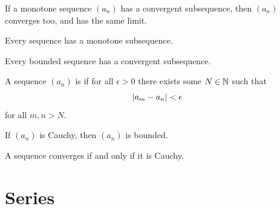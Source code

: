 \documentclass[11pt,twoside=off,numbers=noenddot]{scrbook}
\begin{document}
\begin{proposition}
  If a monotone sequence $(a_n)$ has a convergent subsequence, then
  $(a_n)$ converges too, and has the same limit.
\end{proposition}

\begin{lemma}
  Every sequence has a monotone subsequence.
\end{lemma}

\begin{theorem}
  Every bounded sequence has a convergent subsequence.
\end{theorem}

\begin{definition}
  A sequence $(a_n)$ is  if for all $\epsilon > 0$
  there exists some $N \in \mathbb N$ such that
  \[ | a_m - a_n | < \epsilon \]
  for all $m, n > N$.
\end{definition}

\begin{lemma}
  If $(a_n)$ is Cauchy, then $(a_n)$ is bounded.
\end{lemma}

\begin{theorem}
  A sequence converges if and only if it is Cauchy.
\end{theorem}

\chapter{Series}




\end{document}
